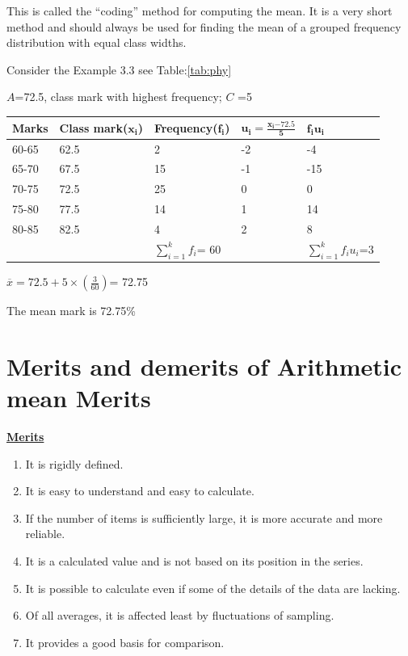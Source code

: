 \documentclass[
]{book}
\begin{document}
This is called the ``coding'' method for computing the mean. It is a very short method and should always be used for finding the mean of a grouped frequency distribution with equal class widths.

Consider the Example 3.3 see Table:\ref{tab:phy}

\(A\)=72.5, class mark with highest frequency; \(C\) =5

\begin{longtable}[]{@{}lllll@{}}
\toprule
Marks & Class mark(\(\mathbf{x}_{\mathbf{i}}\)) & Frequency(\(\mathbf{f}_{\mathbf{i}}\)) & \(\mathbf{u}_{\mathbf{i}}\mathbf{=}\frac{\mathbf{x}_{\mathbf{i}}\mathbf{- 72.5}}{\mathbf{5}}\) & \(\mathbf{f}_{\mathbf{i}}\mathbf{u}_{\mathbf{i}}\) \\
\midrule
\endhead
60-65 & 62.5 & 2 & -2 & -4 \\
65-70 & 67.5 & 15 & -1 & -15 \\
70-75 & 72.5 & 25 & 0 & 0 \\
75-80 & 77.5 & 14 & 1 & 14 \\
80-85 & 82.5 & 4 & 2 & 8 \\
& & \(\sum_{i = 1}^{k}f_{i}\)= 60 & & \(\sum_{i = 1}^{k}{f_{i}u_{i}}\)=3 \\
\bottomrule
\end{longtable}

\(\overline{x} = 72.5 + 5 \times \left( \frac{3}{60} \right)\)= 72.75

The mean mark is 72.75\%

\hypertarget{merits-and-demerits-of-arithmetic-mean-merits}{%
\section{Merits and demerits of Arithmetic mean Merits}\label{merits-and-demerits-of-arithmetic-mean-merits}}

\underline{\textbf{Merits }}

\begin{enumerate}
\def\labelenumi{\arabic{enumi}.}
\item
  It is rigidly defined.
\item
  It is easy to understand and easy to calculate.
\item
  If the number of items is sufficiently large, it is more accurate
  and more reliable.
\item
  It is a calculated value and is not based on its position in the
  series.
\item
  It is possible to calculate even if some of the details of the data
  are lacking.
\item
  Of all averages, it is affected least by fluctuations of sampling.
\item
  It provides a good basis for comparison.
\end{enumerate}
\end{document}
